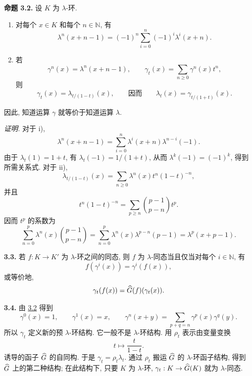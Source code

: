 \textbf{命题 3.2.} 设 \(K\) 为 \(\lambda\)-环.
\begin{enumerate}[label=\roman*)]
\item 对每个 \(x\in K\) 和每个 \(n\in\mathbb N\), 有
\[
  \lambda^n(x+n-1)=(-1)^n\sum_{i=0}^n(-1)^i\lambda^i(x+n).
\]
\item 若
\[
  \gamma^n(x)=\lambda^n(x+n-1),\qquad
  \gamma_t(x)=\sum_{n\ge0}\gamma^n(x)t^n,
\]
则
\[
  \gamma_t(x)=\lambda_{t/(1-t)}(x),
  \qquad\text{因而}\qquad
  \lambda_t(x)=\gamma_{t/(1+t)}(x).
\]
\end{enumerate}
因此, 知道运算 \(\gamma\) 就等价于知道运算 \(\lambda\).

\emph{证明.} 对于 i),
\[
  \lambda^n(x+n-1)=\sum_{i=0}^{n}\lambda^i(x+n)\lambda^{n-i}(-1).
\]
由于 \(\lambda_t(1)=1+t\), 有 \(\lambda_t(-1)=1/(1+t)\), 从而 \(\lambda^k(-1)=(-1)^k\), 得到所需关系式. 对于 ii),
\[
  \lambda_{t/(1-t)}(x)=\sum_{n\ge0}\lambda^n(x)t^n(1-t)^{-n},
\]
并且
\[
  t^n(1-t)^{-n}=\sum_{p\ge n}\binom{p-1}{p-n}t^p.
\]
因而 \(t^p\) 的系数为
\[
  \sum_{n=0}^{p}\lambda^n(x)\binom{p-1}{p-n}
  =\sum_{n=0}^{p}\lambda^n(x)\lambda^{p-n}(p-1)
  =\lambda^p(x+p-1).
\]

\textbf{3.3.} 若 \(f:K\to K'\) 为 \(\lambda\)-环之间的同态, 则 \(f\) 为 \(\lambda\)-同态当且仅当对每个 \(i\in\mathbb N\), 有
\[
  f(\gamma^i(x))=\gamma^i(f(x)),
\]
或等价地,
\[
  \gamma_t(f(x))=\widehat G(f)(\gamma_t(x)).
\]

\textbf{3.4.} 由 \hyperlink{sga6.e05.prop.3-2}{3.2} 得到
\begin{equation}\tag{3.4.1}
  \gamma^0(x)=1,
  \qquad \gamma^1(x)=x,
  \qquad \gamma^n(x+y)=\sum_{p+q=n}\gamma^p(x)\gamma^q(y).
\end{equation}
所以 \(\gamma_t\) 定义新的预 \(\lambda\)-环结构. 它一般不是 \(\lambda\)-环结构. 用 \(\rho_t\) 表示由变量变换
\[
  t\longmapsto \frac{t}{1-t}.
\]
诱导的函子 \(\widehat G\) 的自同构. 于是 \(\gamma_t=\rho_t\lambda_t\). 通过 \(\rho_t\) 搬运 \(\widehat G\) 的 \(\lambda\)-环函子结构, 得到 \(\widehat G\) 上的第二种结构; 在此结构下, 只要 \(K\) 为 \(\lambda\)-环, \(\gamma_t:K\to\widehat G(K)\) 就为 \(\lambda\)-同态.

